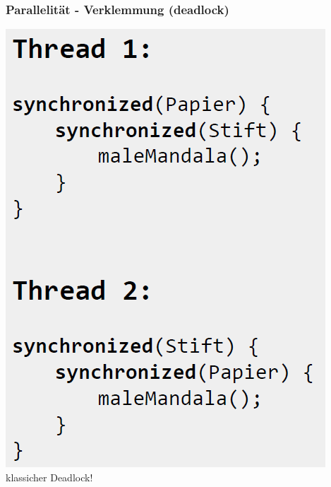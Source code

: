 \documentclass[18pt]{beamer}
\begin{document}
	\begin{frame}
		\frametitle{Parallelität - Verklemmung (deadlock)}
			\centering \includegraphics[scale=0.4]{./pics/tut5/deadlock-ex.png} \linebreak
			klassicher Deadlock!
	\end{frame}
\end{document}
